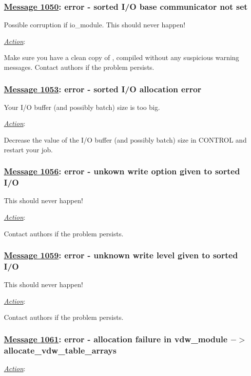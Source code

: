 \subsubsection*{\underline{Message 1050}: error - sorted I/O base communicator not set}

Possible corruption if {\sc io\_module}.  This should never happen!

\noindent \underline{\em Action}:

Make sure you have a clean copy of \D, compiled without any suspicious
warning messages.  Contact authors if the problem persists.

\subsubsection*{\underline{Message 1053}: error - sorted I/O allocation error}

Your I/O buffer (and possibly batch) size is too big.

\noindent \underline{\em Action}:

Decrease the value of the I/O buffer (and possibly batch) size in
CONTROL and restart your job.

\subsubsection*{\underline{Message 1056}: error - unkown write option given to sorted I/O}

This should never happen!

\noindent \underline{\em Action}:

Contact authors if the problem persists.

\subsubsection*{\underline{Message 1059}: error -  unknown write level given to sorted I/O}

This should never happen!

\noindent \underline{\em Action}:

Contact authors if the problem persists.

\subsubsection*{\underline{Message 1061}: error - allocation failure in vdw\_module $->$ allocate\_vdw\_table\_arrays}

\noindent \underline{\em Action}:

